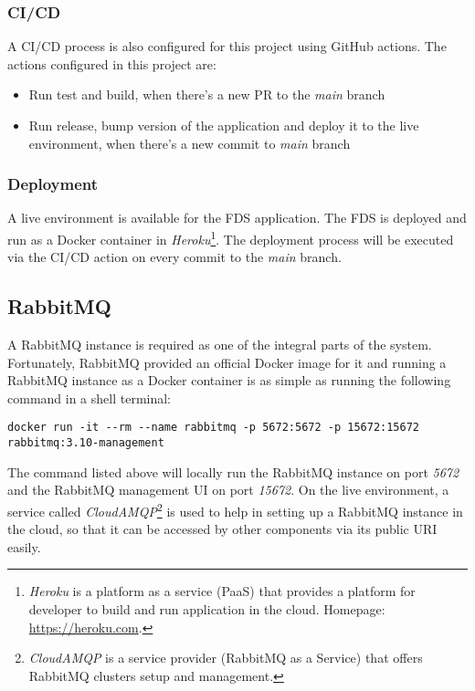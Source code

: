   \subsubsection{CI/CD}
  A CI/CD process is also configured for this project using GitHub actions. The actions configured in this project are:

   \begin{itemize}
    \item Run test and build, when there's a new PR to the \emph{main} branch
    \item Run release, bump version of the application and deploy it to the live environment, when there's a new commit to \emph{main} branch
   \end{itemize}
   
  \subsubsection{Deployment}
  A live environment is available for the FDS application. The FDS is deployed and run as a Docker container in \emph{Heroku}\footnote{\emph{Heroku} is a platform as a service (PaaS) that provides a platform for developer to build and run application in the cloud. Homepage: \url{https://heroku.com}.}. The deployment process will be executed via the CI/CD action on every commit to the \emph{main} branch. 

 \subsection{RabbitMQ}
 A RabbitMQ instance is required as one of the integral parts of the system. Fortunately, RabbitMQ provided an official Docker image for it and running a RabbitMQ instance as a Docker container is as simple as running the following command in a shell terminal:

 \begin{lstlisting}[caption={Running a RabbitMQ instance with Docker (Shell)}]
 docker run -it --rm --name rabbitmq -p 5672:5672 -p 15672:15672 rabbitmq:3.10-management 
 \end{lstlisting}

 The command listed above will locally run the RabbitMQ instance on port \emph{5672} and the RabbitMQ management UI on port \emph{15672}. On the live environment, a service called \emph{CloudAMQP}\footnote{\emph{CloudAMQP} is a service provider (RabbitMQ as a Service) that offers RabbitMQ clusters setup and management.} is used to help in setting up a RabbitMQ instance in the cloud, so that it can be accessed by other components via its public URI easily.


